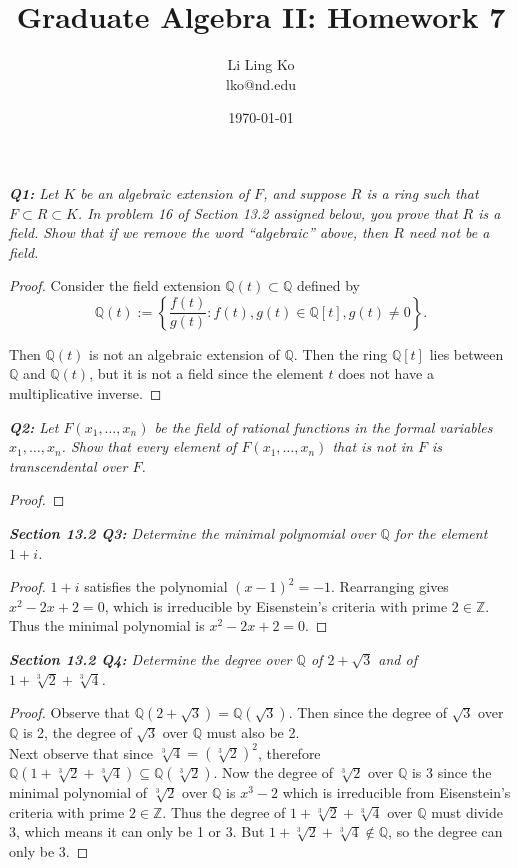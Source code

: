 \documentclass{article}
\begin{document}
\title{Graduate Algebra II: Homework 7}
\author{Li Ling Ko\\ lko@nd.edu}
\date{\today}
\maketitle

\it \textbf{Q1:} Let $K$ be an algebraic extension of $F$, and suppose $R$
  is a ring such that $F\subset R\subset K$. In problem 16 of Section 13.2
  assigned below, you prove that $R$ is a field. Show that if we remove the
  word ``algebraic'' above, then $R$ need not be a field.

  \begin{proof}
    Consider the field extension $\mathbb{Q}(t) \subset \mathbb{Q}$ defined
    by
    \[\mathbb{Q}(t):=\left\{\frac{f(t)}{g(t)}: f(t),g(t)\in\mathbb{Q}[t],
    g(t)\neq0\right\}.\]

    Then $\mathbb{Q}(t)$ is not an algebraic extension of $\mathbb{Q}$.
    Then the ring $\mathbb{Q}[t]$ lies between $\mathbb{Q}$ and
    $\mathbb{Q}(t)$, but it is not a field since the element $t$ does not
    have a multiplicative inverse.
  \end{proof}

\it \textbf{Q2:} Let $F(x_1,\ldots,x_n)$ be the field of rational functions
  in the formal variables $x_1,\ldots,x_n$. Show that every element of
  $F(x_1,\ldots,x_n)$ that is not in $F$ is transcendental over $F$.

  \begin{proof}
  \end{proof}

\it \textbf{Section 13.2 Q3:} Determine the minimal polynomial over
  $\mathbb{Q}$ for the element $1+i$.

  \begin{proof}
    $1+i$ satisfies the polynomial $(x-1)^2=-1$. Rearranging gives
    $x^2-2x+2=0$, which is irreducible by Eisenstein's criteria with prime
    $2\in\mathbb{Z}$. Thus the minimal polynomial is $x^2-2x+2=0$.
  \end{proof}

\it \textbf{Section 13.2 Q4:} Determine the degree over $\mathbb{Q}$ of
  $2+\sqrt{3}$ and of $1+\sqrt[3]{2}+\sqrt[3]{4}$.

  \begin{proof}
    Observe that $\mathbb{Q}(2+\sqrt{3}) =\mathbb{Q}(\sqrt{3})$. Then since
    the degree of $\sqrt{3}$ over $\mathbb{Q}$ is 2, the degree of
    $\sqrt{3}$ over $\mathbb{Q}$ must also be 2. \\

    Next observe that since $\sqrt[3]{4}=(\sqrt[3]{2})^2$, therefore
    $\mathbb{Q}(1+\sqrt[3]{2}+\sqrt[3]{4})\subseteq
    \mathbb{Q}(\sqrt[3]{2})$. Now the degree of $\sqrt[3]{2}$ over
    $\mathbb{Q}$ is 3 since the minimal polynomial of $\sqrt[3]{2}$ over
    $\mathbb{Q}$ is $x^3-2$ which is irreducible from Eisenstein's criteria
    with prime $2\in\mathbb{Z}$. Thus the degree of
    $1+\sqrt[3]{2}+\sqrt[3]{4}$ over $\mathbb{Q}$ must divide 3, which
    means it can only be 1 or 3. But
    $1+\sqrt[3]{2}+\sqrt[3]{4}\not\in\mathbb{Q}$, so the degree can only be
    3.
  \end{proof}
\end{document}
